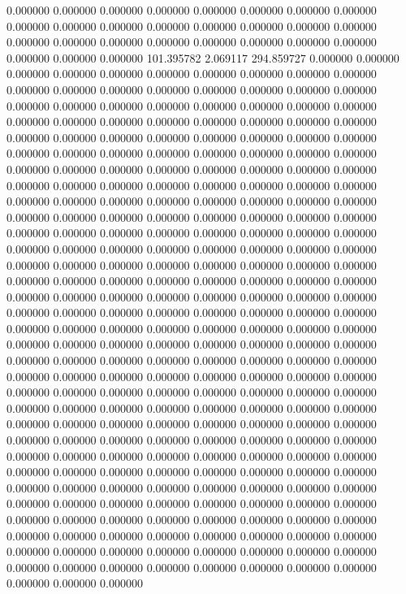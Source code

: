 0.000000 0.000000 0.000000
0.000000 0.000000 0.000000
0.000000 0.000000 0.000000
0.000000 0.000000 0.000000
0.000000 0.000000 0.000000
0.000000 0.000000 0.000000
0.000000 0.000000 0.000000
0.000000 0.000000 0.000000
0.000000 0.000000 0.000000
101.395782 2.069117 294.859727
0.000000 0.000000 0.000000
0.000000 0.000000 0.000000
0.000000 0.000000 0.000000
0.000000 0.000000 0.000000
0.000000 0.000000 0.000000
0.000000 0.000000 0.000000
0.000000 0.000000 0.000000
0.000000 0.000000 0.000000
0.000000 0.000000 0.000000
0.000000 0.000000 0.000000
0.000000 0.000000 0.000000
0.000000 0.000000 0.000000
0.000000 0.000000 0.000000
0.000000 0.000000 0.000000
0.000000 0.000000 0.000000
0.000000 0.000000 0.000000
0.000000 0.000000 0.000000
0.000000 0.000000 0.000000
0.000000 0.000000 0.000000
0.000000 0.000000 0.000000
0.000000 0.000000 0.000000
0.000000 0.000000 0.000000
0.000000 0.000000 0.000000
0.000000 0.000000 0.000000
0.000000 0.000000 0.000000
0.000000 0.000000 0.000000
0.000000 0.000000 0.000000
0.000000 0.000000 0.000000
0.000000 0.000000 0.000000
0.000000 0.000000 0.000000
0.000000 0.000000 0.000000
0.000000 0.000000 0.000000
0.000000 0.000000 0.000000
0.000000 0.000000 0.000000
0.000000 0.000000 0.000000
0.000000 0.000000 0.000000
0.000000 0.000000 0.000000
0.000000 0.000000 0.000000
0.000000 0.000000 0.000000
0.000000 0.000000 0.000000
0.000000 0.000000 0.000000
0.000000 0.000000 0.000000
0.000000 0.000000 0.000000
0.000000 0.000000 0.000000
0.000000 0.000000 0.000000
0.000000 0.000000 0.000000
0.000000 0.000000 0.000000
0.000000 0.000000 0.000000
0.000000 0.000000 0.000000
0.000000 0.000000 0.000000
0.000000 0.000000 0.000000
0.000000 0.000000 0.000000
0.000000 0.000000 0.000000
0.000000 0.000000 0.000000
0.000000 0.000000 0.000000
0.000000 0.000000 0.000000
0.000000 0.000000 0.000000
0.000000 0.000000 0.000000
0.000000 0.000000 0.000000
0.000000 0.000000 0.000000
0.000000 0.000000 0.000000
0.000000 0.000000 0.000000
0.000000 0.000000 0.000000
0.000000 0.000000 0.000000
0.000000 0.000000 0.000000
0.000000 0.000000 0.000000
0.000000 0.000000 0.000000
0.000000 0.000000 0.000000
0.000000 0.000000 0.000000
0.000000 0.000000 0.000000
0.000000 0.000000 0.000000
0.000000 0.000000 0.000000
0.000000 0.000000 0.000000
0.000000 0.000000 0.000000
0.000000 0.000000 0.000000
0.000000 0.000000 0.000000
0.000000 0.000000 0.000000
0.000000 0.000000 0.000000
0.000000 0.000000 0.000000
0.000000 0.000000 0.000000
0.000000 0.000000 0.000000
0.000000 0.000000 0.000000
0.000000 0.000000 0.000000
0.000000 0.000000 0.000000
0.000000 0.000000 0.000000
0.000000 0.000000 0.000000
0.000000 0.000000 0.000000
